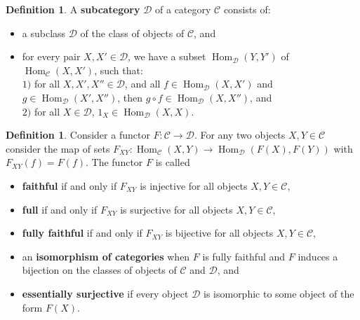 \documentclass{article}
\theoremstyle{plain}
\theoremstyle{definition}
\newtheorem{definition}[theorem]{Definition}
\newtheorem{examples}[theorem]{Examples}
\DeclareMathOperator{\Hom}{Hom}
\begin{document}
\begin{definition}
    A \textbf{subcategory} $\mathcal{D}$ of a category $\mathcal{C}$ consists of:
    \begin{itemize}
        \item[$a)$] a subclass $\mathcal{D}$ of the class of objects of $\mathcal{C}$, and
        \item[$b)$] for every pair $X, X'\in\mathcal{D}$, we have a subset $\Hom_{\mathcal{D}}(Y,Y')$ of $\Hom_{\mathcal{C}}(X,X')$, such that:\\ $1)$ for all $X,X',X''\in\mathcal{D}$, and all $f \in \Hom_{\mathcal{D}}(X,X')$ and $g \in \Hom_{\mathcal{D}}(X',X'')$, then $g\circ f \in \Hom_{\mathcal{D}}(X,X'')$, and\\
        $2)$ for all $X\in\mathcal{D}$, $1_X\in \Hom_{\mathcal{D}}(X,X)$.

    \end{itemize}
\end{definition}

\begin{definition}
    Consider a functor $F : \mathcal{C}\rightarrow\mathcal{D}$. For any two objects $X,Y\in\mathcal{C}$ consider the map of sets $F_{XY} : \Hom_{\mathcal{C}} (X,Y) \rightarrow \Hom_{\mathcal{D}}(F(X),F(Y))$ with  $F_{XY}(f) = F(f)$.
    The functor $F$ is called
    \begin{itemize}
        \item[-] \textbf{faithful} if and only if $F_{XY}$ is injective for all objects $X,Y\in\mathcal{C}$,
        \item[-] \textbf{full} if and only if $F_{XY}$ is surjective for all objects $X,Y\in\mathcal{C}$,
        \item[-] \textbf{fully faithful} if and only if $F_{XY}$ is bijective for all objects $X,Y\in\mathcal{C}$,
        \item[-] an \textbf{isomorphism of categories} when $F$ is fully faithful and $F$ induces a bijection on the classes of objects of $\mathcal{C}$ and $\mathcal{D}$, and
        \item[-] \textbf{essentially surjective} if every object $\mathcal{D}$ is isomorphic to some object of the form $F(X)$.
    \end{itemize}
\end{definition}
\end{document}
